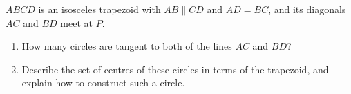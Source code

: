 $ABCD$ is an isosceles trapezoid with $AB\parallel CD$ and $AD=BC$, and its diagonals $AC$ and $BD$ meet at $P$.
\begin{enumerate}
\item[(a)] How many circles are tangent to both of the lines $AC$ and $BD$?
\item[(b)] Describe the set of centres of these circles in terms of the trapezoid, and explain how to construct such a circle.
\end{enumerate}
